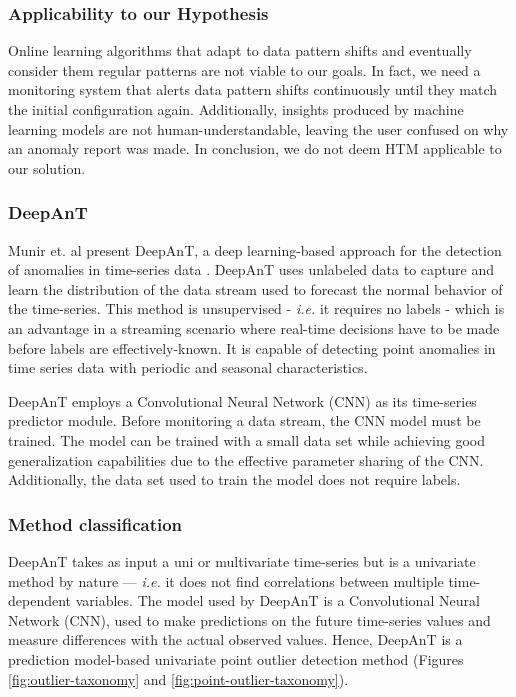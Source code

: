 \subsubsection*{Applicability to our Hypothesis}
Online learning algorithms that adapt to data pattern shifts and eventually consider them regular patterns are not viable to our goals. In fact, we need a monitoring system that alerts data pattern shifts continuously until they match the initial configuration again. Additionally, insights produced by machine learning models are not human-understandable, leaving the user confused on why an anomaly report was made. In conclusion, we do not deem HTM applicable to our solution.


\subsubsection{DeepAnT}
Munir et. al present DeepAnT, a deep learning-based approach for the detection of anomalies in time-series data \cite{Munir-DeepAnT}. DeepAnT uses unlabeled data to capture and learn the distribution of the data stream used to forecast the normal behavior of the time-series. This method is unsupervised - \textit{i.e.} it requires no labels - which is an advantage in a streaming scenario where real-time decisions have to be made before labels are effectively-known. It is capable of detecting point anomalies in time series data with periodic and seasonal characteristics.

DeepAnT employs a Convolutional Neural Network (CNN) as its time-series predictor module. Before monitoring a data stream, the CNN model must be trained. The model can be trained with a small data set while achieving good generalization capabilities due to the effective parameter sharing of the CNN. Additionally, the data set used to train the model does not require labels.

\subsubsection*{Method classification}
DeepAnT takes as input a uni or multivariate time-series but is a univariate method by nature --- \textit{i.e.} it does not find correlations between multiple time-dependent variables. The model used by DeepAnT is a Convolutional Neural Network (CNN), used to make predictions on the future time-series values and measure differences with the actual observed values. Hence, DeepAnT is a prediction model-based univariate point outlier detection method (Figures \ref{fig:outlier-taxonomy} and \ref{fig:point-outlier-taxonomy}).

